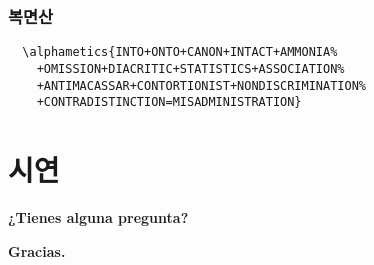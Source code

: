 \documentclass{beamer}
\newcommand{\alphametics}[2][v]{\directlua{puzzle('#1','#2')}}
\begin{document}
%
\begin{frame}[fragile]
  \frametitle{복면산}
  \footnotesize
\begin{verbatim}
  \alphametics{INTO+ONTO+CANON+INTACT+AMMONIA%
    +OMISSION+DIACRITIC+STATISTICS+ASSOCIATION%
    +ANTIMACASSAR+CONTORTIONIST+NONDISCRIMINATION%
    +CONTRADISTINCTION=MISADMINISTRATION}
\end{verbatim}
\end{frame}

%
\section{시연}

%
\begin{frame}
  \huge
  \begin{center}
    \textbf{¿Tienes alguna pregunta?}
  \end{center}
\end{frame}

%
\begin{frame}
  \huge
  \centering \textbf{Gracias.}
\end{frame}
\end{document}

